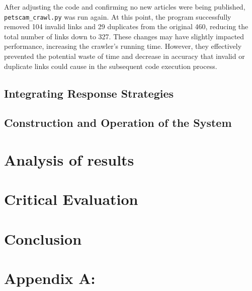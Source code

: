 \documentclass[ oneside,%
                    author={Cassie Qing Tang},
                    degree={BSc},
                     title={An Automated Response System for Disrupting Online Pet Scamming \\ },
                    subtitle={ }]{dissertation}
\begin{document}
After adjusting the code and confirming no new articles were being published, \texttt{petscam\_crawl.py} was run again. At this point, the program successfully removed 104 invalid links and 29 duplicates from the original 460, reducing the total number of links down to 327. These changes may have slightly impacted performance, increasing the crawler's running time. However, they effectively prevented the potential waste of time and decrease in accuracy that invalid or duplicate links could cause in the subsequent code execution process.


\section{Integrating Response Strategies}





\section{Construction and Operation of the System}





\chapter{Analysis of results}



\chapter{Critical Evaluation}









\chapter{Conclusion}





% 


\appendix

\chapter{Appendix A: }
\label{}
\end{document}

